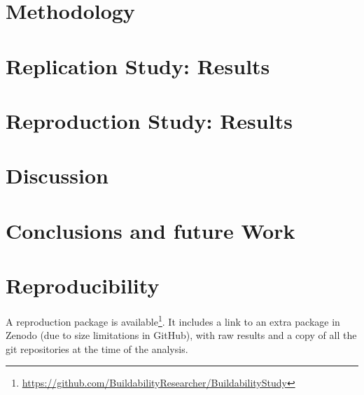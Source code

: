 \documentclass[smallextended]{svjour3}       %
\begin{document}
\section{Methodology}
\label{sec:buildability:metodology}


\section{Replication Study: Results}
\label{sec:buildability:results-repli}


\section{Reproduction Study: Results}
\label{sec:buildability:results-repro}
 

\section{Discussion}
\label{sec:buildability:discussion}


\section{Conclusions and future Work}
\label{sec:buildability:conclusions}


\section*{Reproducibility}
\label{sec:buildability:repro}

A reproduction package is available\footnote{\url{https://github.com/BuildabilityResearcher/BuildabilityStudy}}. It includes a link to an extra package in Zenodo (due to size limitations in GitHub), with raw results and a copy of all the git repositories at the time of the analysis.


\end{document}
